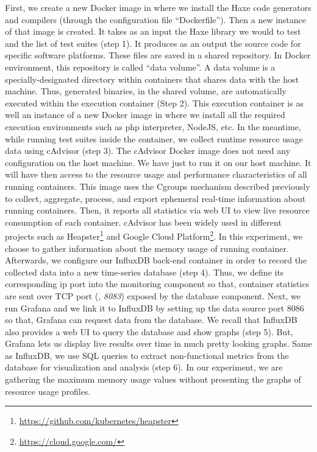 First, we create a new Docker image in where we install the Haxe code generators and compilers (through the configuration file ``Dockerfile''). Then a new instance of that image is created. It takes as an input the Haxe library we would to test and the list of test suites (step 1). It produces as an output the source code for specific software platforms. These files are saved in a shared repository.
In Docker environment, this repository is called ``data volume''. A data volume is a specially-designated directory within containers that shares data with the host machine. 
Thus, generated binaries, in the shared volume, are automatically executed within the execution container (Step 2). This execution container is as well an instance of a new Docker image in where we install all the required execution environments such as php interpreter, NodeJS, etc. 
In the meantime, while running test suites inside the container, we collect runtime resource usage data using cAdvisor (step 3). The cAdvisor Docker image does not need any configuration on the host machine. We have just to run it on our host machine. It will have then access to the resource usage and performance characteristics of all running containers. 
This image uses the Cgroups mechanism described previously to collect, aggregate, process, and export ephemeral real-time information about running containers. 
Then, it reports all statistics via web UI to view live resource consumption of each container. 
cAdvisor has been widely used in different projects such as Heapster\footnote{\url{https://github.com/kubernetes/heapster}} and Google Cloud Platform\footnote{\url{https://cloud.google.com/}}. 
In this experiment, we choose to gather information about the memory usage of running container.
Afterwards, we configure our InfluxDB back-end container in order to record the collected data into a new time-series database (step 4). Thus, we define its corresponding ip port into the monitoring component so that, container statistics are sent over TCP port (\eg, \textit{8083}) exposed by the database component. 
Next, we run Grafana and we link it to InfluxDB by setting up the data source port 8086 so that, 
Grafana can  request data from the database. We recall that InfluxDB also provides a web UI to query the database and show graphs (step 5). But, Grafana lets us display live results over time in much pretty looking graphs. Same as InfluxDB, we use SQL queries to extract non-functional metrics from the database for visualization and analysis (step 6). In our experiment, we are gathering the maximum memory usage values without presenting the graphs of resource usage profiles.

